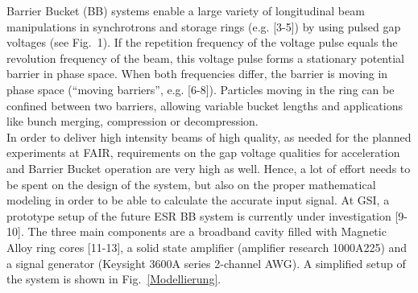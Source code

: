 \documentclass[a4paper,
              ]{jacow}
\begin{document}
	 Barrier Bucket (BB) systems enable a large variety of longitudinal beam manipulations in synchrotrons and storage rings  (e.g. [3-5]) by using %
	 pulsed gap voltages (see Fig.~1). If the repetition frequency of the voltage pulse equals the revolution frequency of the 
	 beam, this voltage pulse forms a stationary potential barrier in phase space. When both frequencies differ, the barrier is moving in phase space (``moving barriers'', e.g. [6-8]). %
	 Particles moving in the ring can be confined between two barriers, allowing variable bucket lengths and applications like bunch merging, compression or 
	 decompression.\\
	 In order to deliver high intensity beams of high quality, as needed for the planned experiments at FAIR, requirements on the gap voltage 
	 qualities for acceleration and Barrier Bucket operation are very high as well. Hence, a lot of effort needs to be spent on the design of the system, but
	 also on the proper mathematical modeling in order to be able to calculate the accurate input signal.
	 At GSI, a prototype setup of the future ESR BB system is currently under investigation [9-10]. The three main components are a broadband cavity filled with %
	 Magnetic Alloy ring cores [11-13], a solid state amplifier (amplifier research 1000A225) and a signal generator (Keysight 3600A series 2-channel AWG).  %
	 A simplified setup of the system is shown in Fig.~\ref{Modellierung}.	 

	 
	 
\end{document}
